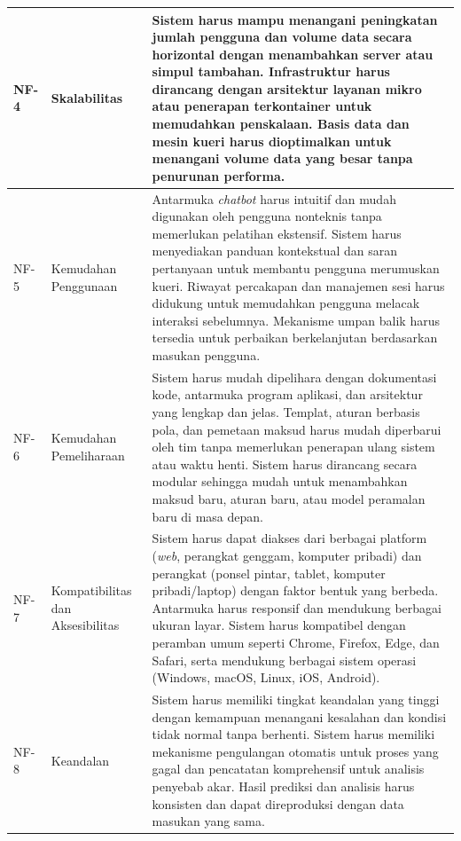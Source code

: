 \begin{longtable}{|p{1.3cm}|p{4.5cm}|p{7cm}|}
NF-4 & Skalabilitas & Sistem harus mampu menangani peningkatan jumlah pengguna dan volume data secara horizontal dengan menambahkan server atau simpul tambahan. Infrastruktur harus dirancang dengan arsitektur layanan mikro atau penerapan terkontainer untuk memudahkan penskalaan. Basis data dan mesin kueri harus dioptimalkan untuk menangani volume data yang besar tanpa penurunan performa. \\
\hline

NF-5 & Kemudahan Penggunaan & Antarmuka \textit{chatbot} harus intuitif dan mudah digunakan oleh pengguna nonteknis tanpa memerlukan pelatihan ekstensif. Sistem harus menyediakan panduan kontekstual dan saran pertanyaan untuk membantu pengguna merumuskan kueri. Riwayat percakapan dan manajemen sesi harus didukung untuk memudahkan pengguna melacak interaksi sebelumnya. Mekanisme umpan balik harus tersedia untuk perbaikan berkelanjutan berdasarkan masukan pengguna. \\
\hline

NF-6 & Kemudahan Pemeliharaan & Sistem harus mudah dipelihara dengan dokumentasi kode, antarmuka program aplikasi, dan arsitektur yang lengkap dan jelas. Templat, aturan berbasis pola, dan pemetaan maksud harus mudah diperbarui oleh tim tanpa memerlukan penerapan ulang sistem atau waktu henti. Sistem harus dirancang secara modular sehingga mudah untuk menambahkan maksud baru, aturan baru, atau model peramalan baru di masa depan. \\
\hline

NF-7 & Kompatibilitas dan Aksesibilitas & Sistem harus dapat diakses dari berbagai platform (\textit{web}, perangkat genggam, komputer pribadi) dan perangkat (ponsel pintar, tablet, komputer pribadi/laptop) dengan faktor bentuk yang berbeda. Antarmuka harus responsif dan mendukung berbagai ukuran layar. Sistem harus kompatibel dengan peramban umum seperti Chrome, Firefox, Edge, dan Safari, serta mendukung berbagai sistem operasi (Windows, macOS, Linux, iOS, Android). \\
\hline

NF-8 & Keandalan & Sistem harus memiliki tingkat keandalan yang tinggi dengan kemampuan menangani kesalahan dan kondisi tidak normal tanpa berhenti. Sistem harus memiliki mekanisme pengulangan otomatis untuk proses yang gagal dan pencatatan komprehensif untuk analisis penyebab akar. Hasil prediksi dan analisis harus konsisten dan dapat direproduksi dengan data masukan yang sama. \\
\hline


\end{longtable}
